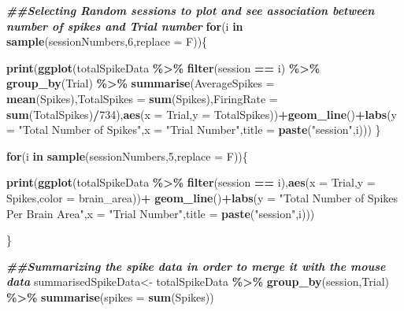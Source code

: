 \documentclass[
]{article}
\newenvironment{Shaded}{\begin{snugshade}}{\end{snugshade}}
\newcommand{\AttributeTok}[1]{\textcolor[rgb]{0.13,0.29,0.53}{#1}}
\newcommand{\ControlFlowTok}[1]{\textcolor[rgb]{0.13,0.29,0.53}{\textbf{#1}}}
\newcommand{\DecValTok}[1]{\textcolor[rgb]{0.00,0.00,0.81}{#1}}
\newcommand{\DocumentationTok}[1]{\textcolor[rgb]{0.56,0.35,0.01}{\textbf{\textit{#1}}}}
\newcommand{\FunctionTok}[1]{\textcolor[rgb]{0.13,0.29,0.53}{\textbf{#1}}}
\newcommand{\NormalTok}[1]{#1}
\newcommand{\OtherTok}[1]{\textcolor[rgb]{0.56,0.35,0.01}{#1}}
\newcommand{\SpecialCharTok}[1]{\textcolor[rgb]{0.81,0.36,0.00}{\textbf{#1}}}
\newcommand{\StringTok}[1]{\textcolor[rgb]{0.31,0.60,0.02}{#1}}
\begin{document}
\begin{Shaded}
\begin{Highlighting}[]
\DocumentationTok{\#\#Selecting Random sessions to plot and see association between number of spikes and Trial number}
\ControlFlowTok{for}\NormalTok{(i }\ControlFlowTok{in} \FunctionTok{sample}\NormalTok{(sessionNumbers,}\DecValTok{6}\NormalTok{,}\AttributeTok{replace =}\NormalTok{ F))\{}

\FunctionTok{print}\NormalTok{(}\FunctionTok{ggplot}\NormalTok{(totalSpikeData }\SpecialCharTok{\%\textgreater{}\%} \FunctionTok{filter}\NormalTok{(session }\SpecialCharTok{==}\NormalTok{ i) }\SpecialCharTok{\%\textgreater{}\%} \FunctionTok{group\_by}\NormalTok{(Trial) }\SpecialCharTok{\%\textgreater{}\%} \FunctionTok{summarise}\NormalTok{(}\AttributeTok{AverageSpikes =} \FunctionTok{mean}\NormalTok{(Spikes),}\AttributeTok{TotalSpikes =} \FunctionTok{sum}\NormalTok{(Spikes),}\AttributeTok{FiringRate =} \FunctionTok{sum}\NormalTok{(TotalSpikes)}\SpecialCharTok{/}\DecValTok{734}\NormalTok{),}\FunctionTok{aes}\NormalTok{(}\AttributeTok{x =}\NormalTok{ Trial,}\AttributeTok{y =}\NormalTok{ TotalSpikes))}\SpecialCharTok{+}\FunctionTok{geom\_line}\NormalTok{()}\SpecialCharTok{+}\FunctionTok{labs}\NormalTok{(}\AttributeTok{y =} \StringTok{"Total Number of Spikes"}\NormalTok{,}\AttributeTok{x =} \StringTok{"Trial Number"}\NormalTok{,}\AttributeTok{title =} \FunctionTok{paste}\NormalTok{(}\StringTok{"session"}\NormalTok{,i)))}
\NormalTok{\}}

\ControlFlowTok{for}\NormalTok{(i }\ControlFlowTok{in} \FunctionTok{sample}\NormalTok{(sessionNumbers,}\DecValTok{5}\NormalTok{,}\AttributeTok{replace =}\NormalTok{ F))\{}
  
  \FunctionTok{print}\NormalTok{(}\FunctionTok{ggplot}\NormalTok{(totalSpikeData }\SpecialCharTok{\%\textgreater{}\%} \FunctionTok{filter}\NormalTok{(session }\SpecialCharTok{==}\NormalTok{ i),}\FunctionTok{aes}\NormalTok{(}\AttributeTok{x =}\NormalTok{ Trial,}\AttributeTok{y =}\NormalTok{ Spikes,}\AttributeTok{color =}\NormalTok{ brain\_area))}\SpecialCharTok{+} \FunctionTok{geom\_line}\NormalTok{()}\SpecialCharTok{+}\FunctionTok{labs}\NormalTok{(}\AttributeTok{y =} \StringTok{"Total Number of Spikes Per Brain Area"}\NormalTok{,}\AttributeTok{x =} \StringTok{"Trial Number"}\NormalTok{,}\AttributeTok{title =} \FunctionTok{paste}\NormalTok{(}\StringTok{"session"}\NormalTok{,i)))}

  
\NormalTok{\}}

\DocumentationTok{\#\#Summarizing the spike data in order to merge it with the mouse data}
\NormalTok{summarisedSpikeData}\OtherTok{\textless{}{-}}\NormalTok{ totalSpikeData }\SpecialCharTok{\%\textgreater{}\%}  \FunctionTok{group\_by}\NormalTok{(session,Trial) }\SpecialCharTok{\%\textgreater{}\%} \FunctionTok{summarise}\NormalTok{(}\AttributeTok{spikes =} \FunctionTok{sum}\NormalTok{(Spikes))}



\end{Highlighting}
\end{Shaded}
\end{document}
